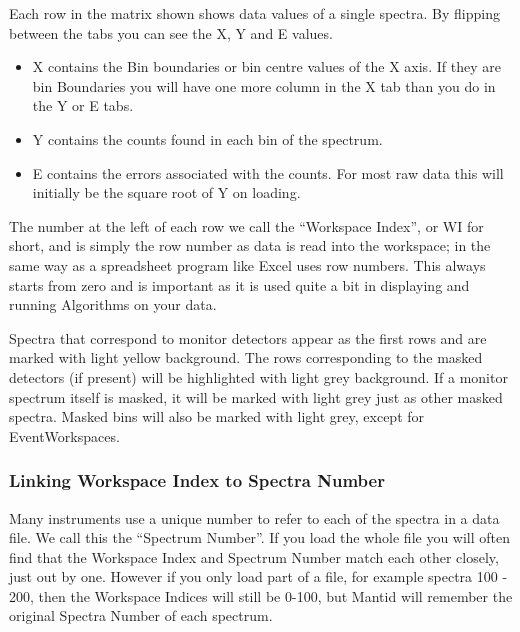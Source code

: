 \documentclass[letterpaper,10pt,english,openany]{sphinxmanual}
\begin{document}
\begin{figure}[H]
\centering

\noindent{}
\end{figure}

Each row in the matrix shown shows data values of a single spectra. By
flipping between the tabs you can see the X, Y and E values.
\begin{itemize}
\item {} 
X contains the Bin boundaries or bin centre values of the X axis. If
they are bin Boundaries you will have one more column in the X tab
than you do in the Y or E tabs.

\item {} 
Y contains the counts found in each bin of the spectrum.

\item {} 
E contains the errors associated with the counts. For most raw data
this will initially be the square root of Y on loading.

\end{itemize}

The number at the left of each row we call the “Workspace Index”, or WI
for short, and is simply the row number as data is read into the
workspace; in the same way as a spreadsheet program like Excel uses row
numbers. This always starts from zero and is important as it is used
quite a bit in displaying and running Algorithms on your data.

Spectra that correspond to monitor detectors appear as the first rows
and are marked with light yellow background. The rows corresponding to
the masked detectors (if present) will be highlighted with light grey
background. If a monitor spectrum itself is masked, it will be marked
with light grey just as other masked spectra. Masked bins will also be
marked with light grey, except for EventWorkspaces.


\subsubsection{Linking Workspace Index to Spectra Number}
\label{\detokenize{mantid_basic_course/loading_and_displaying_data/02_the_matrix_workspace:linking-workspace-index-to-spectra-number}}
Many instruments use a unique number to refer to each of the spectra in
a data file. We call this the “Spectrum Number”. If you load the whole
file you will often find that the Workspace Index and Spectrum Number
match each other closely, just out by one. However if you only load part
of a file, for example spectra 100 - 200, then the Workspace Indices
will still be 0-100, but Mantid will remember the original Spectra
Number of each spectrum.
\end{document}
